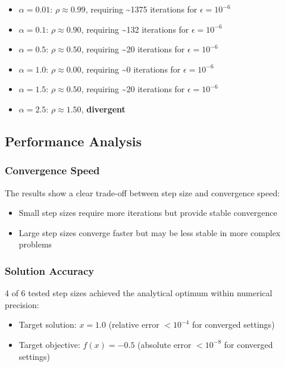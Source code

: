 \documentclass[
]{article}
\providecommand{\tightlist}{%
  \setlength{\itemsep}{0pt}\setlength{\parskip}{0pt}}
\begin{document}
\begin{itemize}
\tightlist
\item
  \(\alpha = 0.01\): \(\rho \approx 0.99\), requiring
  \textasciitilde1375 iterations for \(\epsilon = 10^{-6}\)
\item
  \(\alpha = 0.1\): \(\rho \approx 0.90\), requiring \textasciitilde132
  iterations for \(\epsilon = 10^{-6}\)
\item
  \(\alpha = 0.5\): \(\rho \approx 0.50\), requiring \textasciitilde20
  iterations for \(\epsilon = 10^{-6}\)
\item
  \(\alpha = 1.0\): \(\rho \approx 0.00\), requiring \textasciitilde0
  iterations for \(\epsilon = 10^{-6}\)
\item
  \(\alpha = 1.5\): \(\rho \approx 0.50\), requiring \textasciitilde20
  iterations for \(\epsilon = 10^{-6}\)
\item
  \(\alpha = 2.5\): \(\rho \approx 1.50\), \textbf{divergent}
\end{itemize}

\subsection{Performance Analysis}\label{performance-analysis}

\subsubsection{Convergence Speed}\label{convergence-speed}

The results show a clear trade-off between step size and convergence
speed:

\begin{itemize}
\tightlist
\item
  Small step sizes require more iterations but provide stable
  convergence
\item
  Large step sizes converge faster but may be less stable in more
  complex problems
\end{itemize}

\subsubsection{Solution Accuracy}\label{solution-accuracy}

4 of 6 tested step sizes achieved the analytical optimum within
numerical precision:

\begin{itemize}
\tightlist
\item
  Target solution: \(x = 1.0\) (relative error \(< 10^{-4}\) for
  converged settings)
\item
  Target objective: \(f(x) = -0.5\) (absolute error \(< 10^{-8}\) for
  converged settings)
\end{itemize}
\end{document}
